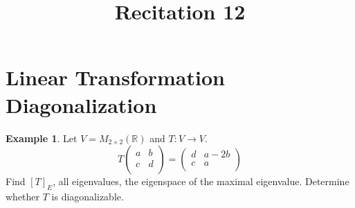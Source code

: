 \documentclass[fleqn, a4paper, 12pt]{article}
\title{Recitation 12}
\author{}
\date{\formatdate{7}{1}{2015}}
\theoremstyle{definition}
\newtheorem{example}{Example}
\theoremstyle{theorem}
\begin{document}
\maketitle

\tableofcontents

\newpage
\section{Linear Transformation Diagonalization}

\begin{example}
	Let $V = M_{2 \times 2} (\mathbb{R})$ and $T : V \to V$.
	\begin{equation*}
	T 
		\begin{pmatrix}
			a & b\\
			c & d\\
		\end{pmatrix}
	=
		\begin{pmatrix}
			d & a - 2b\\
			c & a\\
		\end{pmatrix}
	\end{equation*}
	Find $[T]_E$, all eigenvalues, the eigenspace of the maximal eigenvalue. Determine whether $T$ is diagonalizable. 
\end{example}
\end{document}
